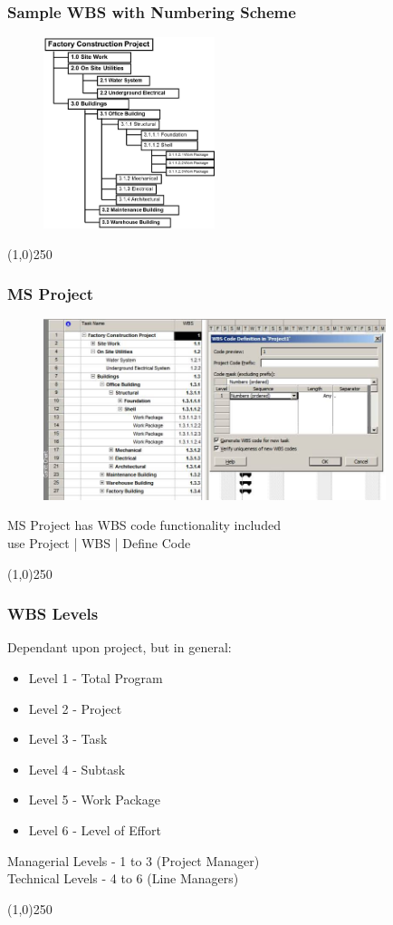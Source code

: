 \begin{frame}
\frametitle{Sample WBS with Numbering Scheme}
\begin{figure}
	\centering
		\includegraphics[width = 5cm]{images/wbscode.jpg}
	\label{fig:wbscode}
\end{figure}
\end{frame}\begin{center}\line(1,0){250}\end{center}



\begin{frame}
\frametitle{MS Project}
\begin{figure}
	\centering
		\includegraphics[width = 10cm]{images/msprojectwbs.jpg}
	\label{fig:msprojectwbs}
\end{figure}
MS Project has WBS code functionality included\\ 
use Project | WBS | Define Code
\end{frame}\begin{center}\line(1,0){250}\end{center}



\begin{frame}
\frametitle{WBS Levels}
Dependant upon project, but in general:\\
\begin{itemize}
	\item Level 1 - Total Program
	\item Level 2 - Project 
	\item Level 3 - Task
	\item Level 4 - Subtask
	\item Level 5 - Work Package
	\item Level 6 - Level of Effort
\end{itemize}
Managerial Levels - 1 to 3 (Project Manager)\\
Technical Levels - 4 to 6 (Line Managers)\\
\end{frame}\begin{center}\line(1,0){250}\end{center}



